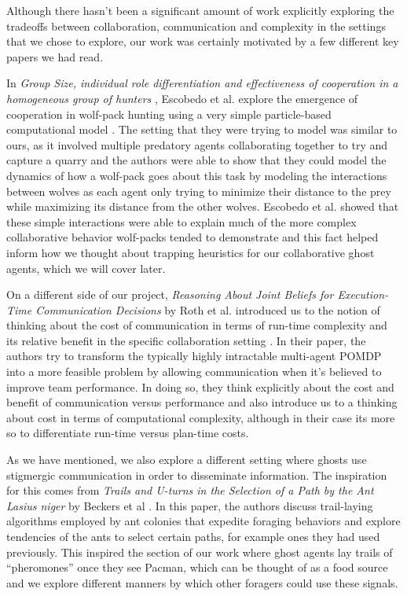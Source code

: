 \documentclass[11pt]{article}
\begin{document}
\begin{multicols}{2}
Although there hasn’t been a significant amount of work explicitly exploring the tradeoffs between collaboration, communication and complexity in the settings that we chose to explore, our work was certainly motivated by a few different key papers we had read. 

In \textit{ Group Size, individual role differentiation and effectiveness of cooperation in a homogeneous group of hunters }, Escobedo et al. explore the emergence of cooperation in wolf-pack hunting using a very simple particle-based computational model \cite{escobedo2014group}. The setting that they were trying to model was similar to ours, as it involved multiple predatory agents collaborating together to try and capture a quarry and the authors were able to show that they could model the dynamics of how a wolf-pack goes about this task by modeling the interactions between wolves as each agent only trying to minimize their distance to the prey while maximizing its distance from the other wolves. Escobedo et al. showed that these simple interactions were able to explain much of the more complex collaborative behavior wolf-packs tended to demonstrate and this fact helped inform how we thought about trapping heuristics for our collaborative ghost agents, which we will cover later.

On a different side of our project, \textit{Reasoning About Joint Beliefs for Execution-Time Communication Decisions } by Roth et al. introduced us to the notion of thinking about the cost of communication in terms of run-time complexity and its relative benefit in the specific collaboration setting \cite{roth2005reasoning}. In their paper, the authors try to transform the typically highly intractable multi-agent POMDP into a more feasible problem by allowing communication when it’s believed to improve team performance. In doing so, they think explicitly about the cost and benefit of communication versus performance and also introduce us to a thinking about cost in terms of computational complexity, although in their case its more so to differentiate run-time versus plan-time costs.

As we have mentioned, we also explore a different setting where ghosts use stigmergic communication in order to disseminate information. The inspiration for this comes from \textit{Trails and U-turns in the Selection of a Path by the Ant Lasius niger} by Beckers et al  \cite{beckers1992trails}. In this paper, the authors discuss trail-laying algorithms employed by ant colonies that expedite foraging behaviors and explore tendencies of the ants to select certain paths, for example ones they had used previously. This inspired the section of our work where ghost agents lay trails of “pheromones” once they see Pacman, which can be thought of as a food source and we explore different manners by which other foragers could use these signals. 


\end{multicols}
\end{document}

